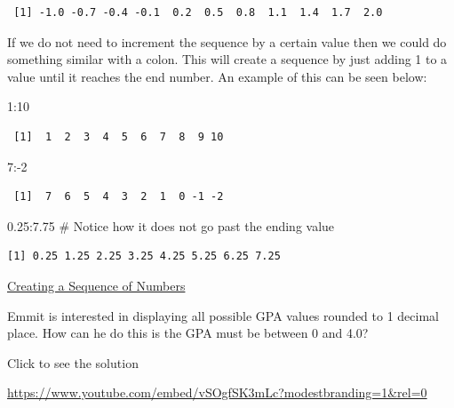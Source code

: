 \documentclass[
  letterpaper,
  DIV=11,
  numbers=noendperiod]{scrreprt}
\newenvironment{Shaded}{\begin{snugshade}}{\end{snugshade}}
\newcommand{\CommentTok}[1]{\textcolor[rgb]{0.37,0.37,0.37}{#1}}
\newcommand{\DecValTok}[1]{\textcolor[rgb]{0.68,0.00,0.00}{#1}}
\newcommand{\FloatTok}[1]{\textcolor[rgb]{0.68,0.00,0.00}{#1}}
\newcommand{\SpecialCharTok}[1]{\textcolor[rgb]{0.37,0.37,0.37}{#1}}
\begin{document}
\begin{verbatim}
 [1] -1.0 -0.7 -0.4 -0.1  0.2  0.5  0.8  1.1  1.4  1.7  2.0
\end{verbatim}

If we do not need to increment the sequence by a certain value then we
could do something similar with a colon. This will create a sequence by
just adding 1 to a value until it reaches the end number. An example of
this can be seen below:

\begin{Shaded}
\begin{Highlighting}[]
\DecValTok{1}\SpecialCharTok{:}\DecValTok{10}
\end{Highlighting}
\end{Shaded}

\begin{verbatim}
 [1]  1  2  3  4  5  6  7  8  9 10
\end{verbatim}

\begin{Shaded}
\begin{Highlighting}[]
\DecValTok{7}\SpecialCharTok{:{-}}\DecValTok{2}
\end{Highlighting}
\end{Shaded}

\begin{verbatim}
 [1]  7  6  5  4  3  2  1  0 -1 -2
\end{verbatim}

\begin{Shaded}
\begin{Highlighting}[]
\FloatTok{0.25}\SpecialCharTok{:}\FloatTok{7.75} \CommentTok{\# Notice how it does not go past the ending value}
\end{Highlighting}
\end{Shaded}

\begin{verbatim}
[1] 0.25 1.25 2.25 3.25 4.25 5.25 6.25 7.25
\end{verbatim}

\begin{watch}{}{}
    \href{https://youtu.be/c4qJ3Y5hJ0s}{Creating a Sequence of Numbers}
\end{watch}

\begin{tcolorbox}[enhanced jigsaw, colbacktitle=quarto-callout-tip-color!10!white, breakable, bottomrule=.15mm, colframe=quarto-callout-tip-color-frame, left=2mm, opacitybacktitle=0.6, title=\textcolor{quarto-callout-tip-color}{\faLightbulb}\hspace{0.5em}{Try it Out}, leftrule=.75mm, opacityback=0, rightrule=.15mm, titlerule=0mm, bottomtitle=1mm, colback=white, toprule=.15mm, arc=.35mm, toptitle=1mm, coltitle=black]

Emmit is interested in displaying all possible GPA values rounded to 1
decimal place. How can he do this is the GPA must be between 0 and 4.0?

Click to see the solution

\url{https://www.youtube.com/embed/vSOgfSK3mLc?modestbranding=1&rel=0}

\end{tcolorbox}
\end{document}
